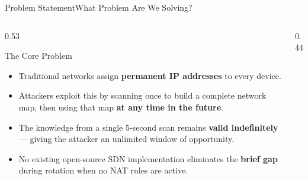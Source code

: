 \documentclass[aspectratio=169,10pt]{beamer}
\begin{document}
\begin{frame}{Problem Statement}{What Problem Are We Solving?}
  \begin{columns}[T]
    \begin{column}{0.53\textwidth}
      \begin{block}{The Core Problem}
        \begin{itemize}\small\setlength\itemsep{5pt}
          \item Traditional networks assign \textbf{permanent IP addresses} to every device.
          \item Attackers exploit this by scanning once to build a complete network map, then using that map \textbf{at any time in the future}.
          \item The knowledge from a single 5-second scan remains \textbf{valid indefinitely} --- giving the attacker an unlimited window of opportunity.
          \item No existing open-source SDN implementation eliminates the \textbf{brief gap} during rotation when no NAT rules are active.
        \end{itemize}
      \end{block}
    \end{column}
    \begin{column}{0.44\textwidth}
      \vspace{0.2cm}
    \end{column}
  \end{columns}
\end{frame}
\end{document}
